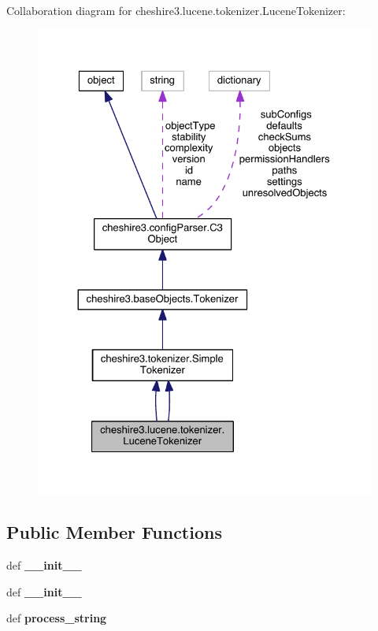 Collaboration diagram for cheshire3.\-lucene.\-tokenizer.\-Lucene\-Tokenizer\-:
\nopagebreak
\begin{figure}[H]
\begin{center}
\leavevmode
\includegraphics[width=326pt]{classcheshire3_1_1lucene_1_1tokenizer_1_1_lucene_tokenizer__coll__graph}
\end{center}
\end{figure}
\subsection*{Public Member Functions}
\begin{DoxyCompactItemize}
\item 
\hypertarget{classcheshire3_1_1lucene_1_1tokenizer_1_1_lucene_tokenizer_a01999c0389afd011015fd6cd422abb8c}{def {\bfseries \-\_\-\-\_\-init\-\_\-\-\_\-}}\label{classcheshire3_1_1lucene_1_1tokenizer_1_1_lucene_tokenizer_a01999c0389afd011015fd6cd422abb8c}

\item 
\hypertarget{classcheshire3_1_1lucene_1_1tokenizer_1_1_lucene_tokenizer_a01999c0389afd011015fd6cd422abb8c}{def {\bfseries \-\_\-\-\_\-init\-\_\-\-\_\-}}\label{classcheshire3_1_1lucene_1_1tokenizer_1_1_lucene_tokenizer_a01999c0389afd011015fd6cd422abb8c}

\item 
\hypertarget{classcheshire3_1_1lucene_1_1tokenizer_1_1_lucene_tokenizer_aba26223436876fc56fbfe102acec549d}{def {\bfseries process\-\_\-string}}\label{classcheshire3_1_1lucene_1_1tokenizer_1_1_lucene_tokenizer_aba26223436876fc56fbfe102acec549d}

\end{DoxyCompactItemize}
